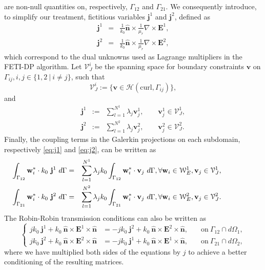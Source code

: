 \noindent are non-null quantities on, respectively, $\Gamma_{12}$ and $\Gamma_{21}$.
%
\noindent We consequently introduce, to simplify our treatment, fictitious variables $\mathbf{j}^1$ and $\mathbf{j}^2$, defined as
\begin{eqnarray}
\mathbf{j}^1 & = & \frac{1}{k_0} \hat{\mathbf{n}} \times \frac{1}{\mu_r} \nabla \times {\mathbf{E}^1},\\
\mathbf{j}^2 & = & \frac{1}{k_0} \hat{\mathbf{n}} \times \frac{1}{\mu_r} \nabla \times {\mathbf{E}^2},
\end{eqnarray}
\noindent which correspond to the dual unknowns used as Lagrange multipliers in the FETI-DP algorithm. Let $\mathcal{V}_J^i$ be the spanning space for boundary constraints $\mathbf{v}$ on $\Gamma_{ij}, i, j \in \lbrace1,2 \ | \ i \neq j\rbrace$, such that
$$\mathcal{V}_J^i := \{ \mathbf{v} \in \mathcal{H}(\mathrm{curl},\Gamma_{ij}) \},$$
\noindent and 
\begin{eqnarray}
\label{eq:auxfieldExp}
\mathbf{j}^1 &:= & \sum_{l=1}^{N^1} \lambda_j \mathbf{v}_j^1, \qquad \mathbf{v}_j^1 \in \mathcal{V}_J^1, \nonumber \\
\mathbf{j}^2 &:= & \sum_{l=1}^{N^2} \lambda_j \mathbf{v}_j^2, \qquad \mathbf{v}_j^2 \in \mathcal{V}_J^2.\nonumber
\end{eqnarray}
\noindent Finally, the coupling terms in the Galerkin projections on each subdomain, respectively \eqref{eq:j1} and \eqref{eq:j2}, can be written as
\begin{eqnarray}
\hspace{-1.6cm}\int_{\Gamma_{12}} \mathbf{w}_i^* \cdot k_0 \ \mathbf{j}^1 \ d\Gamma &= &\sum_{l=1}^{N^1} \lambda_j k_0 \int_{\Gamma_{12}}\mathbf{w}_i^* \cdot \mathbf{v}_j \ d\Gamma, \forall \mathbf{w}_i \in \mathcal{W}_E^1, \mathbf{v}_j \in \mathcal{V}_J^1, \label{eq:j1form}\\
\hspace{-1.6cm}\int_{\Gamma_{21}} \mathbf{w}_i^* \cdot k_0 \ \mathbf{j}^2 \ d\Gamma &= &\sum_{l=1}^{N^2} \lambda_j k_0 \int_{\Gamma_{21}}\mathbf{w}_i^* \cdot \mathbf{v}_j \ d\Gamma, \forall \mathbf{w}_i \in \mathcal{W}_E^2, \mathbf{v}_j \in \mathcal{V}_J^2.\label{eq:j2form}
\end{eqnarray}
%
\noindent The Robin-Robin transmission conditions can also be written as
\begin{equation}
\label{eq:RRTC}
\left\lbrace
\begin{aligned}
j k_0 \ \mathbf{j}^1 + k_0 \ \hat{\mathbf{n}} \times \mathbf{E}^1 \times \hat{\mathbf{n}} &=  - jk_0 \ \mathbf{j}^2 + k_0 \ \hat{\mathbf{n}} \times \mathbf{E}^2 \times \hat{\mathbf{n}},& \quad \mathrm{on} \ \Gamma_{12} \cap d\Omega_1,\\
j k_0 \ \mathbf{j}^2 + k_0 \ \hat{\mathbf{n}} \times \mathbf{E}^2 \times \hat{\mathbf{n}} &=  - jk_0 \ \mathbf{j}^1 + k_0 \ \hat{\mathbf{n}} \times \mathbf{E}^1 \times \hat{\mathbf{n}},& \quad \mathrm{on} \ \Gamma_{21} \cap d\Omega_2,
\end{aligned}
\right.
\end{equation}
\noindent where we have multiplied both sides of the equations by $j$ to achieve a better conditioning of the resulting matrices.

